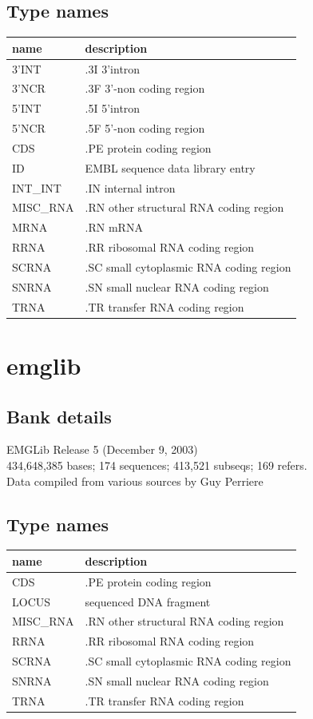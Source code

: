 \documentclass{article}
\begin{document}
\begin{Schunk}
\subsection{Type names}
\noindent\begin{tabular}{ll}
\hline \hline
name & description\\
\hline
3'INT & .3I 3'intron \\
3'NCR & .3F  3'-non coding region \\
5'INT & .5I 5'intron \\
5'NCR & .5F  5'-non coding region \\
CDS & .PE protein coding region \\
ID & EMBL sequence data library entry \\
INT\_INT & .IN  internal intron \\
MISC\_RNA & .RN other structural RNA coding region \\
MRNA & .RN mRNA \\
RRNA & .RR ribosomal RNA coding region \\
SCRNA & .SC small cytoplasmic RNA coding region \\
SNRNA & .SN small nuclear RNA coding region \\
TRNA & .TR transfer RNA coding region \\
\hline \hline
\end{tabular}

\section{ emglib }
\subsection{Bank details}
EMGLib Release 5 (December 9, 2003)\\
434,648,385 bases; 174 sequences; 413,521 subseqs; 169 refers.\\
Data compiled from various sources by Guy Perriere

\subsection{Type names}
\noindent\begin{tabular}{ll}
\hline \hline
name & description\\
\hline
CDS & .PE protein coding region \\
LOCUS & sequenced DNA fragment \\
MISC\_RNA & .RN other structural RNA coding region \\
RRNA & .RR ribosomal RNA coding region \\
SCRNA & .SC small cytoplasmic RNA coding region \\
SNRNA & .SN small nuclear RNA coding region \\
TRNA & .TR transfer RNA coding region \\
\hline \hline
\end{tabular}


\end{Schunk}
\end{document}
